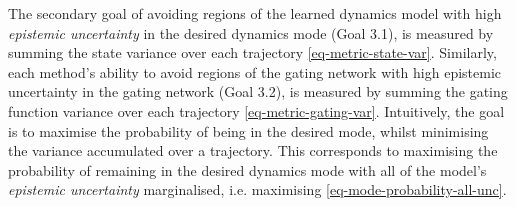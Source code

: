 \documentclass{mimosis-class/mimosis}
\numberwithin{equation}{chapter}
\begin{document}
{The secondary goal of avoiding regions of the learned dynamics model with high \emph{epistemic uncertainty}
in the desired dynamics mode (Goal 3.1), is measured by summing the state variance
over each trajectory \cref{eq-metric-state-var}.
Similarly, each method's ability to avoid regions of the gating network with high epistemic
uncertainty in the gating network (Goal 3.2),
is measured by summing the gating function variance over each trajectory \cref{eq-metric-gating-var}.
Intuitively, the goal is to maximise the probability of being in the desired mode,
whilst minimising the variance accumulated over a trajectory.
This corresponds to maximising the probability of remaining in the desired dynamics mode
with all of the model's \emph{epistemic uncertainty} marginalised, i.e. maximising \cref{eq-mode-probability-all-unc}.

}
\end{document}
